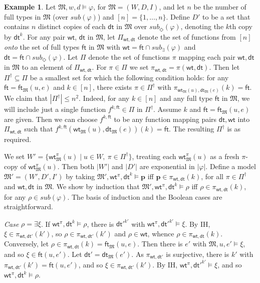 \documentclass[10pt,a4paper]{amsart}
\theoremstyle{plain}
\theoremstyle{definition}
\newtheorem{exa}[thm]{Example}
\newcommand{\sub}{\textit{sub}}
\newcommand{\wt}{\mathsf{wt}}
\newcommand{\dt}{\mathsf{dt}}
\newcommand{\ft}{\mathsf{ft}}
\newcommand{\fform}[1]{\boldsymbol{#1}}
\newcommand{\pvar}{\fform{p}}
\begin{document}
\begin{exa}\label{s5sat}
Let $\mathfrak M, w,d \models \varphi$, for $\mathfrak M = (W,D,I)$, and let $n$ be the number of full types in $\mathfrak M$  (over $\sub(\varphi)$) and $[n] = \{1,\dots,n\}$. Define $D'$ to be a set that contains $n$ distinct copies of each $\dt$ in $\mathfrak M$ over $\sub_\Diamond(\varphi)$, denoting the $k$th copy by $\dt^k$. For any pair $\wt$, $\dt$ in $\mathfrak M$, let $\Pi_{\wt,\dt}$ denote the set of functions from $[n]$ \emph{onto} the set of full types $\ft$ in $\mathfrak{M}$ with $\wt = \ft \cap \sub_\exists(\varphi)$ and $\dt = \ft \cap \sub_\Diamond(\varphi)$. 
Let $\Pi$ denote the set of functions $\pi$ mapping each pair $\wt,\dt$ in $\mathfrak{M}$ to an element of $\Pi_{\wt,\dt}$. For $\pi\in \Pi$ we set 
$\pi_{\wt,\dt}=\pi(\wt,\dt)$. Then let $\Pi^{\dag}\subseteq \Pi$
be a smallest set for which the following condition holds: 
for any $\ft=\ft_{\mathfrak M}(u,e)$ and $k\in [n]$, there exists $\pi\in \Pi^{\dag}$ with $\pi_{\wt_{\mathfrak M}(u),\dt_{\mathfrak M}(e)}(k) = \ft$. 
%
We claim that $|\Pi^{\dag}|\leq n^{2}$. Indeed, for any $k\in [n]$ and any full type $\ft$ in $\mathfrak{M}$,
we will include just a single function $f^{k,\ft}\in \Pi$ in $\Pi^\dag$.
Assume $k$ and $\ft=\ft_{\mathfrak{M}}(u,e)$ are given. Then we can choose $f^{k,\ft}$ to be any function mapping pairs $\dt,\wt$ into $\Pi_{\wt,\dt}$ such that $f^{k,\ft}(\wt_{\mathfrak{M}}(u),\dt_{\mathfrak{M}}(e))(k)=\ft$. The resulting $\Pi^{\dag}$ is as required.

We set $W' = \{\wt^\pi_{\mathfrak M}(u) \mid u \in W,\ \pi \in \Pi^{\dag}\}$, treating each $\wt^\pi_{\mathfrak M}(u)$ as
a fresh $\pi$-copy of $\wt^\pi_{\mathfrak M}(u)$. Then both $|W'|$ and $|D'|$ are exponential in $|\varphi|$. Define a model $\mathfrak M' = (W',D',I')$ by taking $\mathfrak M', \wt^\pi, \dt^k \models \pvar$ iff $\pvar \in \pi_{\wt,\dt}(k)$, for all $\pi\in \Pi^{\dag}$ and $\wt,\dt$ in $\mathfrak{M}$. We show by induction that $\mathfrak M', \wt^\pi, \dt^k \models \rho$ iff $\rho \in \pi_{\wt,\dt}(k)$, for any $\rho \in \sub(\varphi)$. The basis of induction and the Boolean cases are straightforward.

\emph{Case} $\rho = \exists \xi$. If $\wt^\pi,\dt^k \models \rho$, there is $\dt'^{k'}$ with $\wt^\pi,\dt'^{k'} \models \xi$. By IH, $\xi \in \pi_{\wt,\dt'}(k')$, so $\rho \in \pi_{\wt,\dt'}(k')$ and $\rho \in \wt$, whence  $\rho \in \pi_{\wt,\dt}(k)$. Conversely, let $\rho \in \pi_{\wt,\dt}(k) = \ft_{\mathfrak{M}}(u,e)$. Then there is $e'$ with $\mathfrak{M}, u, e' \models \xi$, and so $\xi\in\ft(u,e')$. Let $\dt'=\dt_{\mathfrak M}(e')$. 
As $\pi_{\wt,\dt'}$ is surjective, there is $k'$ with $\pi_{\wt,\dt'}(k')=\ft(u,e')$, and so  $\xi\in \pi_{\wt,\dt'}(k')$. By IH, $\wt^\pi, \dt'^{k'} \models \xi$, and so $\wt^\pi, \dt^k \models \rho$. 


\end{exa}
\end{document}
